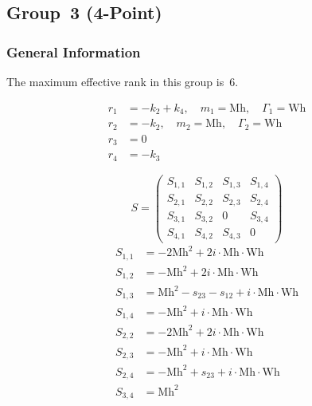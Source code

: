 \documentclass[a4paper]{article}
\begin{document}

\subsection{Group~3 (4-Point)}
\subsubsection*{General Information}
The maximum effective rank in this group is~6.

\begin{subequations}
\begin{align}
r_{1} &= -k_{2}+k_{4},\quad m_{1} = \text{Mh},\quad \Gamma_{1} = \text{Wh}\\
r_{2} &= -k_{2},\quad m_{2} = \text{Mh},\quad \Gamma_{2} = \text{Wh}\\
r_{3} &= 0\\
r_{4} &= -k_{3}
\end{align}
\end{subequations}

\begin{equation}
S=\left(\begin{array}{cccc}
   S_{1,1}&
   S_{1,2}&
   S_{1,3}&
   S_{1,4}\\
   S_{2,1}&
   S_{2,2}&
   S_{2,3}&
   S_{2,4}\\
   S_{3,1}&
   S_{3,2}&
   0&
   S_{3,4}\\
   S_{4,1}&
   S_{4,2}&
   S_{4,3}&
   0\end{array}\right)
\end{equation}
\begin{subequations}
\begin{align}
   S_{1,1}&=-2\text{Mh}^2+2i\cdot{}\text{Mh}\cdot{}\text{Wh}\\
   S_{1,2}&=-\text{Mh}^2+2i\cdot{}\text{Mh}\cdot{}\text{Wh}\\
   S_{1,3}&=\text{Mh}^2-s_{23}-s_{12}+i\cdot{}\text{Mh}\cdot{}\text{Wh}\\
   S_{1,4}&=-\text{Mh}^2+i\cdot{}\text{Mh}\cdot{}\text{Wh}\\
   S_{2,2}&=-2\text{Mh}^2+2i\cdot{}\text{Mh}\cdot{}\text{Wh}\\
   S_{2,3}&=-\text{Mh}^2+i\cdot{}\text{Mh}\cdot{}\text{Wh}\\
   S_{2,4}&=-\text{Mh}^2+s_{23}+i\cdot{}\text{Mh}\cdot{}\text{Wh}\\
   S_{3,4}&=\text{Mh}^2
\end{align}
\end{subequations}
\end{document}
